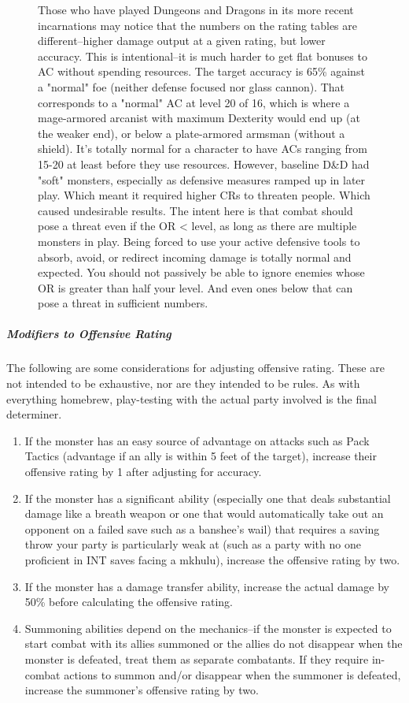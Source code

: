\begin{figure}
	\begin{DndComment}
		Those who have played Dungeons and Dragons in its more recent incarnations may notice that the numbers on the rating tables are different--higher damage output at a given rating, but lower accuracy. This is intentional--it is much harder to get flat bonuses to AC without spending resources. The target accuracy is 65\% against a "normal" foe (neither defense focused nor glass cannon). That corresponds to a "normal" AC at level 20 of 16, which is where a mage-armored arcanist with maximum Dexterity would end up (at the weaker end), or below a plate-armored armsman (without a shield). It's totally normal for a character to have ACs ranging from 15-20 at least before they use resources. However, baseline D\&D had "soft" monsters, especially as defensive measures ramped up in later play. Which meant it required higher CRs to threaten people. Which caused undesirable results. The intent here is that combat should pose a threat even if the OR < level, as long as there are multiple monsters in play. Being forced to use your active defensive tools to absorb, avoid, or redirect incoming damage is totally normal and expected. You should not passively be able to ignore enemies whose OR is greater than half your level. And even ones below that can pose a threat in sufficient numbers.
	\end{DndComment}
\end{figure}

\subparagraph*{Modifiers to Offensive Rating}
The following are some considerations for adjusting offensive rating. These are not intended to be exhaustive, nor are they intended to be rules. As with everything homebrew, play-testing with the actual party involved is the final determiner.
\begin{enumerate}
	\item If the monster has an easy source of advantage on attacks such as Pack Tactics (advantage if an ally is within 5 feet of the target), increase their offensive rating by 1 after adjusting for accuracy.
	\item If the monster has a significant ability (especially one that deals substantial damage like a breath weapon or one that would automatically take out an opponent on a failed save such as a banshee's wail) that requires a saving throw your party is particularly weak at (such as a party with no one proficient in INT saves facing a mkhulu), increase the offensive rating by two.
	\item If the monster has a damage transfer ability, increase the actual damage by 50\% before calculating the offensive rating.
	\item Summoning abilities depend on the mechanics--if the monster is expected to start combat with its allies summoned or the allies do not disappear when the monster is defeated, treat them as separate combatants. If they require in-combat actions to summon and/or disappear when the summoner is defeated, increase the summoner's offensive rating by two.
\end{enumerate}

